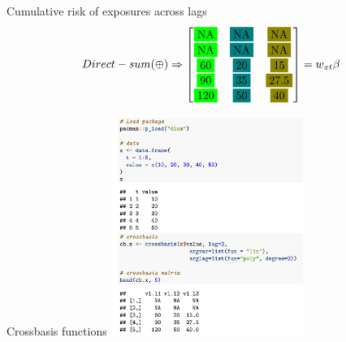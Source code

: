 \documentclass[english]{beamer}
\begin{document}
\begin{frame}{Cumulative risk of exposures across lags}
\[ Direct-sum (\oplus) \Rightarrow
\begin{bmatrix}
\fcolorbox{white}{green}{NA} & \fcolorbox{white}{teal}{NA} & \fcolorbox{white}{olive}{NA} \\
\fcolorbox{white}{green}{NA} & \fcolorbox{white}{teal}{NA} & \fcolorbox{white}{olive}{NA} \\
\fcolorbox{white}{green}{60} & \fcolorbox{white}{teal}{20} & \fcolorbox{white}{olive}{15} \\
\fcolorbox{white}{green}{90} & \fcolorbox{white}{teal}{35} & \fcolorbox{white}{olive}{27.5} \\
\fcolorbox{white}{green}{120} & \fcolorbox{white}{teal}{50} & \fcolorbox{white}{olive}{40} \\
\end{bmatrix} = w_{xt}\beta
\]
\end{frame}
\begin{frame}{Crossbasis functions}
    \centering
    \includegraphics[width=6.25cm,keepaspectratio]{images/crossbasis_result.png}
\end{frame}
\end{document}
